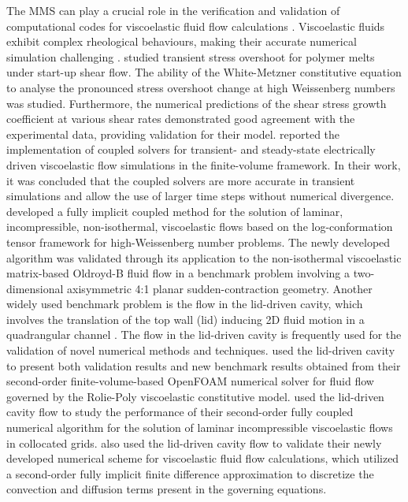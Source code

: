 \documentclass[preprint, 12pt]{elsarticle}
\begin{document}
The MMS can play a crucial role in the verification and validation of computational codes for viscoelastic fluid flow calculations \cite{Garcia2022}. Viscoelastic fluids exhibit complex rheological behaviours, making their accurate numerical simulation challenging \cite{Fernandes2017}. 
\citeauthor{Tseng2021} studied transient stress overshoot for polymer melts under start-up shear flow. The ability of the White-Metzner constitutive equation to analyse the pronounced stress overshoot change at high Weissenberg numbers was studied. Furthermore, the numerical predictions of the shear stress growth coefficient at various shear rates demonstrated good agreement with the experimental data, providing validation for their model. \citet{Pimenta2019} reported the implementation of coupled solvers for transient- and steady-state electrically driven viscoelastic flow simulations in the finite-volume framework. In their work, it was concluded that the coupled solvers are more accurate in transient simulations and allow the use of larger time steps without numerical divergence. \citet{Fernandes2022} developed a fully implicit coupled method for the solution of laminar, incompressible, non-isothermal, viscoelastic flows based on the log-conformation tensor framework for high-Weissenberg number problems. The newly developed algorithm was validated through its application to the non-isothermal viscoelastic matrix-based Oldroyd-B fluid flow in a benchmark problem involving a two-dimensional axisymmetric 4:1 planar sudden-contraction geometry. Another widely used benchmark problem is the flow in the lid-driven cavity, which involves the translation of the top wall (lid) inducing 2D fluid motion in a quadrangular channel \cite{Shankar2000}. The flow in the lid-driven cavity is frequently used for the validation of novel numerical methods and techniques. \citet{Abuga2020} used the lid-driven cavity to present both validation results and new benchmark results obtained from their second-order finite-volume-based OpenFOAM numerical solver for fluid flow governed by the Rolie-Poly viscoelastic constitutive model. \citet{Fernandes2019} used the lid-driven cavity flow to study the performance of their second-order fully coupled numerical algorithm for the solution of laminar incompressible viscoelastic flows in collocated grids. \citet{Tomio2020} also used the lid-driven cavity flow to validate their newly developed numerical scheme for viscoelastic fluid flow calculations, which utilized a second-order fully implicit finite difference approximation to discretize the convection and diffusion terms present in the governing equations.
\end{document}
